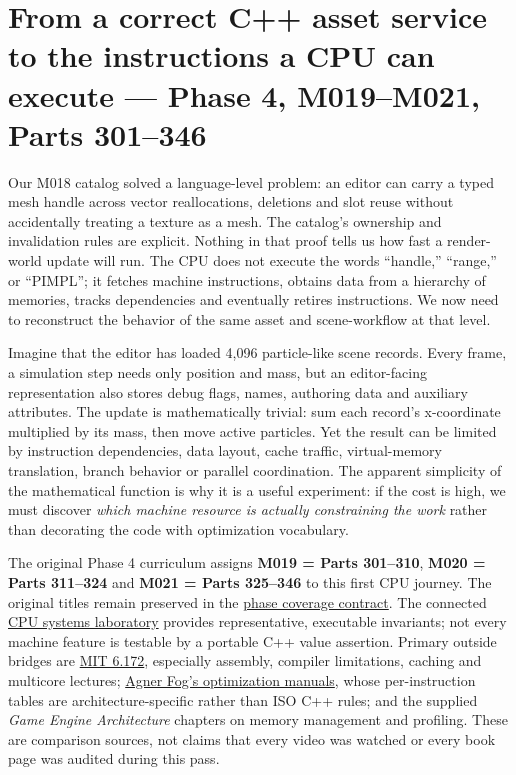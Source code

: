 \section{From a correct C++ asset service to the instructions a CPU can execute --- Phase 4, M019--M021, Parts 301--346}\label{01-foundations-i-ch007-from-a-correct-c-asset-service-to-the-instructions-a-cpu-can-execute-phase-4-m019m021-parts-301346}

Our M018 catalog solved a language-level problem: an editor can carry a typed mesh handle across vector reallocations, deletions and slot reuse without accidentally treating a texture as a mesh. The catalog's ownership and invalidation rules are explicit. Nothing in that proof tells us how fast a render-world update will run. The CPU does not execute the words ``handle,'' ``range,'' or ``PIMPL''; it fetches machine instructions, obtains data from a hierarchy of memories, tracks dependencies and eventually retires instructions. We now need to reconstruct the behavior of the same asset and scene-workflow at that level.

Imagine that the editor has loaded 4,096 particle-like scene records. Every frame, a simulation step needs only position and mass, but an editor-facing representation also stores debug flags, names, authoring data and auxiliary attributes. The update is mathematically trivial: sum each record's x-coordinate multiplied by its mass, then move active particles. Yet the result can be limited by instruction dependencies, data layout, cache traffic, virtual-memory translation, branch behavior or parallel coordination. The apparent simplicity of the mathematical function is why it is a useful experiment: if the cost is high, we must discover \emph{which machine resource is actually constraining the work} rather than decorating the code with optimization vocabulary.

The original Phase 4 curriculum assigns \textbf{M019 = Parts 301--310}, \textbf{M020 = Parts 311--324} and \textbf{M021 = Parts 325--346} to this first CPU journey. The original titles remain preserved in the \hyperref[appendix-fd090d982a15-phase-4-cpu-architecture-and-measured-execution-parts-301400]{phase coverage contract}. The connected \hyperref[source-file-0060a91bd24dd25d6c14e679]{CPU systems laboratory} provides representative, executable invariants; not every machine feature is testable by a portable C++ value assertion. Primary outside bridges are \href{https://ocw.mit.edu/courses/6-172-performance-engineering-of-software-systems-fall-2018/video_galleries/lecture-videos/}{MIT 6.172}, especially assembly, compiler limitations, caching and multicore lectures; \href{https://www.agner.org/optimize/}{Agner Fog's optimization manuals}, whose per-instruction tables are architecture-specific rather than ISO C++ rules; and the supplied \emph{Game Engine Architecture} chapters on memory management and profiling. These are comparison sources, not claims that every video was watched or every book page was audited during this pass.

